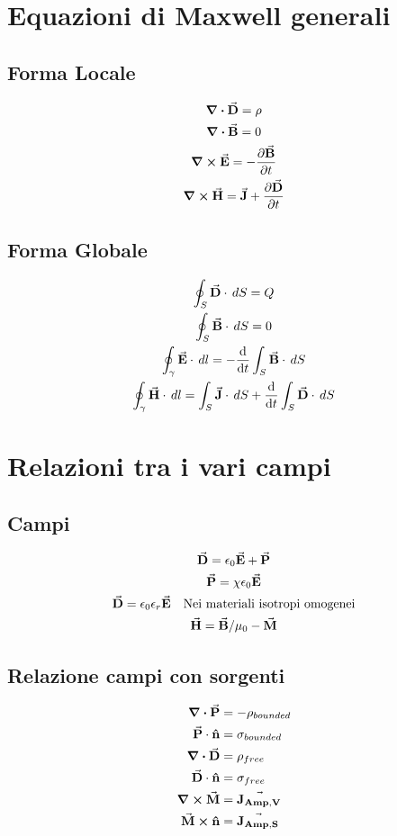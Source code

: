 \documentclass[a4paper]{article}
\begin{document}
    
\section{Equazioni di Maxwell generali}

\subsection{Forma Locale}
\begin{gather}
    \div{\va D} = \rho\\
    \div{\va B} = 0\\
    \curl{\va E}= -\pdv{\va B}{t}\\ 
    \curl{\va H}= \va J +  \pdv{\va D}{t}
\end{gather}

\subsection{Forma Globale}

\begin{gather}
    \oint_S \va D \cdot  \,dS= Q\\
    \oint_S \va B \cdot \,dS= 0\\
    \oint_\gamma \va E \cdot \,dl = -\dv{t}\int_S \va B \cdot \,dS\\
    \oint_\gamma \va H \cdot \,dl = \int_S \va J \cdot \,dS + \dv{t}\int_S \va D \cdot \,dS\\
\end{gather}

\section{Relazioni tra i vari campi}

\subsection{Campi}

\begin{gather}
    \va D = \epsilon_0 \va E + \va P\\
    \va P = \chi\epsilon_0 \va E \\
    \va D = \epsilon_0 \epsilon_r \va E \quad \text{Nei materiali isotropi omogenei}\\
    \va H = \va B/\mu_0 - \va M
\end{gather}

\subsection{Relazione campi con sorgenti}
\begin{align}
    \div {\va P} & = - \rho_{bounded}\\
    \va P \cdot  \vu n &= \sigma_{bounded}\\
    \div {\va D} &= \rho_{free}\\
    \va D \cdot  \vu n &= \sigma_{free}\\
    \curl {\va M} &= \va {J_{Amp, V}}\\
    \va M \cross \vu n &= \va {J_{Amp, S}}
\end{align}
\end{document}
